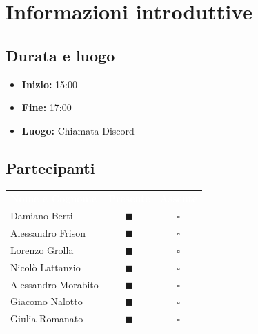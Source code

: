 \documentclass[a4paper, 11pt]{article}
\begin{document}

\section{Informazioni introduttive}

\subsection{Durata e luogo}
\begin{itemize}
    \item \textbf{Inizio:} 15:00
    \item \textbf{Fine:} 17:00
    \item \textbf{Luogo:} Chiamata Discord
\end{itemize}

\subsection{Partecipanti}
\begin{center}
    \begin{tabular}{>{\raggedright\arraybackslash}p{6cm} c c}
        \rowcolor{AccentColor}
        \textcolor{white}{\textbf{Nome e Cognome}} & 
        \textcolor{white}{\textbf{Presente}} & 
        \textcolor{white}{\textbf{Assente}} \\
        
        Damiano Berti     & \textcolor{AccentColor}{$\blacksquare$}    & $\square$        \\
        Alessandro Frison     & \textcolor{AccentColor}{$\blacksquare$}    & $\square$        \\
        Lorenzo Grolla     & \textcolor{AccentColor}{$\blacksquare$}    & $\square$        \\
        Nicolò Lattanzio    & \textcolor{AccentColor}{$\blacksquare$}    & $\square$        \\
        Alessandro Morabito   & \textcolor{AccentColor}{$\blacksquare$}    & $\square$        \\
        Giacomo Nalotto   & \textcolor{AccentColor}{$\blacksquare$}    & $\square$        \\
        Giulia Romanato   & \textcolor{AccentColor}{$\blacksquare$}    & $\square$        \\
    \end{tabular}
\end{center}
\end{document}
